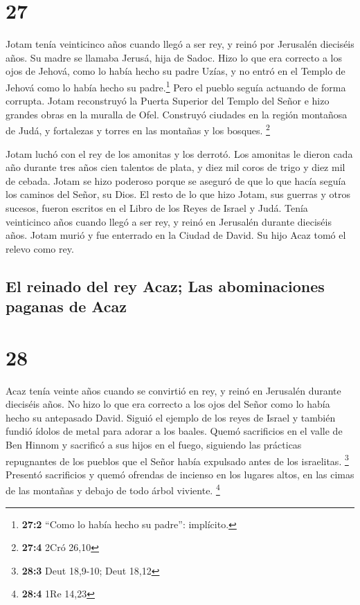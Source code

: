 \hypertarget{section-26}{%
\section{27}\label{section-26}}

 Jotam tenía veinticinco años cuando llegó a ser rey, y
reinó por Jerusalén dieciséis años. Su madre se llamaba Jerusá, hija de
Sadoc.  Hizo lo que era correcto a los ojos de Jehová,
como lo había hecho su padre Uzías, y no entró en el Templo de Jehová
como lo había hecho su padre.\footnote{\textbf{27:2} ``Como lo había
  hecho su padre'': implícito.} Pero el pueblo seguía actuando de forma
corrupta.  Jotam reconstruyó la Puerta Superior del Templo
del Señor e hizo grandes obras en la muralla de Ofel. 
Construyó ciudades en la región montañosa de Judá, y fortalezas y torres
en las montañas y los bosques. \footnote{\textbf{27:4} 2Cró 26,10}

 Jotam luchó con el rey de los amonitas y los derrotó. Los
amonitas le dieron cada año durante tres años cien talentos de plata, y
diez mil coros de trigo y diez mil de cebada.  Jotam se
hizo poderoso porque se aseguró de que lo que hacía seguía los caminos
del Señor, su Dios.  El resto de lo que hizo Jotam, sus
guerras y otros sucesos, fueron escritos en el Libro de los Reyes de
Israel y Judá.  Tenía veinticinco años cuando llegó a ser
rey, y reinó en Jerusalén durante dieciséis años.  Jotam
murió y fue enterrado en la Ciudad de David. Su hijo Acaz tomó el relevo
como rey.

\hypertarget{el-reinado-del-rey-acaz-las-abominaciones-paganas-de-acaz}{%
\subsection{El reinado del rey Acaz; Las abominaciones paganas de
Acaz}\label{el-reinado-del-rey-acaz-las-abominaciones-paganas-de-acaz}}

\hypertarget{section-27}{%
\section{28}\label{section-27}}

 Acaz tenía veinte años cuando se convirtió en rey, y
reinó en Jerusalén durante dieciséis años. No hizo lo que era correcto a
los ojos del Señor como lo había hecho su antepasado David.
 Siguió el ejemplo de los reyes de Israel y también fundió
ídolos de metal para adorar a los baales.  Quemó
sacrificios en el valle de Ben Hinnom y sacrificó a sus hijos en el
fuego, siguiendo las prácticas repugnantes de los pueblos que el Señor
había expulsado antes de los israelitas. \footnote{\textbf{28:3} Deut
  18,9-10; Deut 18,12}  Presentó sacrificios y quemó
ofrendas de incienso en los lugares altos, en las cimas de las montañas
y debajo de todo árbol viviente. \footnote{\textbf{28:4} 1Re 14,23}

